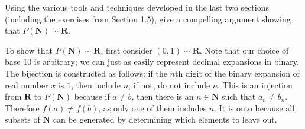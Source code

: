 \begin{exercise}
\end{exercise}

\begin{solution}
\end{solution}

\begin{exercise}
  \SKIP
\end{exercise}

\begin{exercise}
\end{exercise}

\begin{solution}
\end{solution}

\begin{exercise}
  Using the various tools and techniques developed in the last two sections (including the exercises from Section 1.5), give a compelling argument showing that $P(\mathbf{N}) \sim \mathbf{R}$.
\end{exercise}

\begin{solution}
  To show that $P(\mathbf{N})\sim \mathbf{R}$, first consider $(0, 1)\sim \mathbf{R}$. Note that our choice of base 10 is arbitrary; we can just as easily represent decimal expansions in binary. The bijection is constructed as follows: if the $n$th digit of the binary expansion of real number $x$ is $1$, then include $n$; if not, do not include $n$. This is an injection from $\mathbf{R}$ to $P(\mathbf{N})$ because if $a\neq b$, then there is an $n\in\mathbf{N}$ such that $a_n\neq b_n$. Therefore $f(a)\neq f(b)$, as only one of them includes $n$. It is onto because all subsets of $\mathbf{N}$ can be generated by determining which elements to leave out.
\end{solution}

